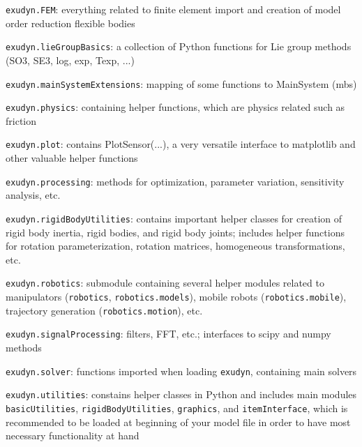     \item[--] \texttt{exudyn.FEM}: everything related to finite element import and creation of model order reduction flexible bodies
    \item[--] \texttt{exudyn.lieGroupBasics}: a collection of Python functions for Lie group methods (SO3, SE3, log, exp, Texp, ...)
    \item[--] \texttt{exudyn.mainSystemExtensions}: mapping of some functions to MainSystem (mbs)
    \item[--] \texttt{exudyn.physics}: containing helper functions, which are physics related such as friction
    \item[--] \texttt{exudyn.plot}: contains PlotSensor(...), a very versatile interface to matplotlib and other valuable helper functions
    \item[--] \texttt{exudyn.processing}: methods for optimization, parameter variation, sensitivity analysis, etc.
    \item[--] \texttt{exudyn.rigidBodyUtilities}: contains important helper classes for creation of rigid body inertia, rigid bodies, and rigid body joints; includes helper functions for rotation parameterization, rotation matrices, homogeneous transformations, etc.
    \item[--] \texttt{exudyn.robotics}: submodule containing several helper modules related to manipulators (\texttt{robotics}, \texttt{robotics.models}), mobile robots (\texttt{robotics.mobile}), trajectory generation (\texttt{robotics.motion}), etc.
    \item[--] \texttt{exudyn.signalProcessing}: filters, FFT, etc.; interfaces to scipy and numpy methods
    \item[--] \texttt{exudyn.solver}: functions imported when loading \texttt{exudyn}, containing main solvers
    \item[--] \texttt{exudyn.utilities}: constains helper classes in Python and includes \codeName main modules \texttt{basicUtilities}, \texttt{rigidBodyUtilities}, \texttt{graphics}, and \texttt{itemInterface}, which is recommended to be loaded at beginning of your model file in order to have most necessary functionality at hand
  \ei
\ei
%
